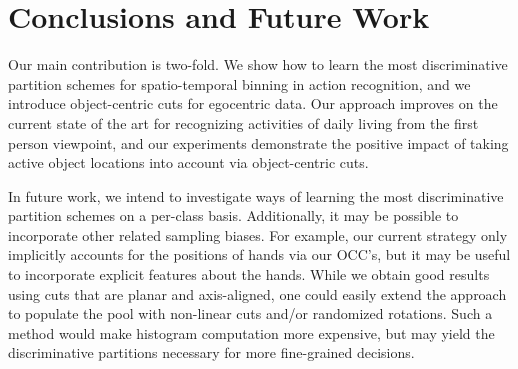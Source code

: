 
\section{Conclusions and Future Work}

	Our main contribution is two-fold. We show how to learn the most
  discriminative partition schemes for spatio-temporal binning in action recognition, and
  we introduce object-centric cuts for egocentric data.  
  Our  approach improves on the current state of the art for recognizing activities of daily living from the first person viewpoint, and our
  experiments demonstrate the positive impact of taking active object
  locations into account via object-centric cuts.

  In future work, we intend to investigate ways of learning the most
  discriminative partition schemes on a per-class basis.
	Additionally, it may be possible to incorporate other related sampling biases. For example, our current strategy only implicitly accounts for the positions of hands via our OCC's, but it may be useful to incorporate explicit features about the hands.
	While we obtain good results using cuts that are
  planar and axis-aligned, one could easily extend the approach to populate the pool with non-linear cuts and/or randomized rotations. Such a method would
  make histogram computation more expensive, but may yield the discriminative
	partitions necessary for more fine-grained decisions.